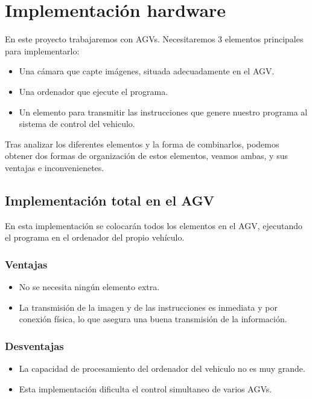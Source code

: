 
\section{Implementación hardware}
En este proyecto trabajaremos con AGVs. Necesitaremos 3 elementos principales para implementarlo:

\begin{itemize}
	\item Una cámara que capte imágenes, situada adecuadamente en el AGV.
	
	\item Una ordenador que ejecute el programa.
	
	\item Un elemento para transmitir las instrucciones que genere nuestro programa al sistema de control del vehiculo.
	
\end{itemize}

Tras analizar los diferentes elementos y la forma de combinarlos, podemos obtener dos formas de organización de estos elementos, veamos ambas, y sus ventajas e inconvenienetes.
 

\subsection{Implementación total en el AGV}
En esta implementación se colocarán todos los elementos en el AGV, ejecutando el programa en el ordenador del propio vehículo.
\subsubsection{Ventajas}
\begin{itemize}

	\item No se necesita ningún elemento extra.
	
	\item La transmisión de la imagen y de las instrucciones es inmediata y por conexión física, lo que asegura una buena transmisión de la información.
	
\end{itemize} 

\subsubsection{Desventajas} 
\begin{itemize}

	\item La capacidad de procesamiento del ordenador del vehiculo no es muy grande.
	
	\item Esta implementación dificulta el control simultaneo de varios AGVs.
	
\end{itemize}

